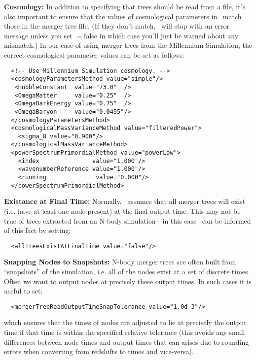 {\bf Cosmology:} In addition to specifying that trees should be read from a file, it's also important to ensure that the values of cosmological parameters in \glc\ match those in the merger tree file. (If they don't match, \glc\ will stop with an error message unless you set {\normalfont \ttfamily [mergerTreeReadMismatchIsFatal]}$=${\normalfont \ttfamily false} in which case you'll just be warned about any mismatch.) In our case of using merger trees from the Millennium Simulation, the correct cosmological parameter values can be set as follows:
\begin{verbatim}
  <!-- Use Millennium Simulation cosmology. -->
  <cosmologyParametersMethod value="simple"/>
   <HubbleConstant  value="73.0"  />
   <OmegaMatter     value="0.25"  />
   <OmegaDarkEnergy value="0.75"  />
   <OmegaBaryon     value="0.0455"/>
  </cosmologyParametersMethod>
  <cosmologicalMassVarianceMethod value="filteredPower">
    <sigma_8 value="0.900"/>
  </cosmologicalMassVarianceMethod>
  <powerSpectrumPrimordialMethod value="powerLaw">
    <index               value="1.000"/>
    <wavenumberReference value="1.000"/>
    <running              value="0.000"/>
  </powerSpectrumPrimordialMethod>
\end{verbatim}

{\bf Existance at Final Time:} Normally, \glc\ assumes that all merger trees will exist (i.e. have at least one node present) at the final output time. This may not be true of trees extracted from an N-body simulation---in this case \glc\ can be informed of this fact by setting:
\begin{verbatim}
  <allTreesExistAtFinalTime value="false"/>
\end{verbatim}

{\bf Snapping Nodes to Snapshots:} N-body merger trees are often built from ``snapshots'' of the simulation, i.e. all of the nodes exist at a set of discrete times. Often we want to output nodes at precisely these output times. In such cases it is useful to set:
\begin{verbatim}
  <mergerTreeReadOutputTimeSnapTolerance value="1.0d-3"/>
\end{verbatim}
which ensures that the times of nodes are adjusted to lie at precisely the output time if that time is within the specified relative tolerance (this avoids any small differences between node times and output times that can arises due to rounding errors when converting from redshifts to times and vice-versa).

